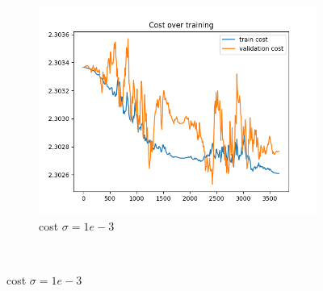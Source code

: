 \documentclass[a4paper]{article}
\begin{document}
\begin{figure}[h]
\begin{subfigure}{0.3\textwidth}
		\includegraphics[width=\linewidth]{images/sens_sigma_0.001_use_bn_False_cost.png}
		\caption{cost $\sigma=1e-3$}
	\end{subfigure} \\


\end{figure}
\end{document}

